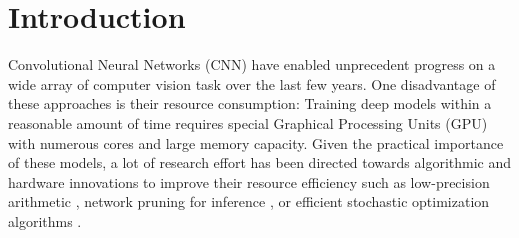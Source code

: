 \documentclass[twocolumn]{bmcart}
\begin{document}
\begin{frontmatter}
\begin{fmbox}
\begin{abstractbox}

\begin{keyword}
\end{keyword}


\end{abstractbox}
\end{fmbox}%
\end{frontmatter}




\section{Introduction}
Convolutional Neural Networks (CNN) have enabled unprecedent progress on a wide array of computer vision task over the last few years.
One disadvantage of these approaches is their resource consumption: 
Training deep models within a reasonable amount of time requires special
Graphical Processing Units (GPU) with numerous cores and large memory capacity.
Given the practical importance of these models, a lot of research effort has been directed
towards algorithmic and hardware innovations to improve their resource efficiency such as low-precision arithmetic \cite{}, network pruning for inference \cite{}, or efficient stochastic optimization algorithms \cite{}.
\end{document}
